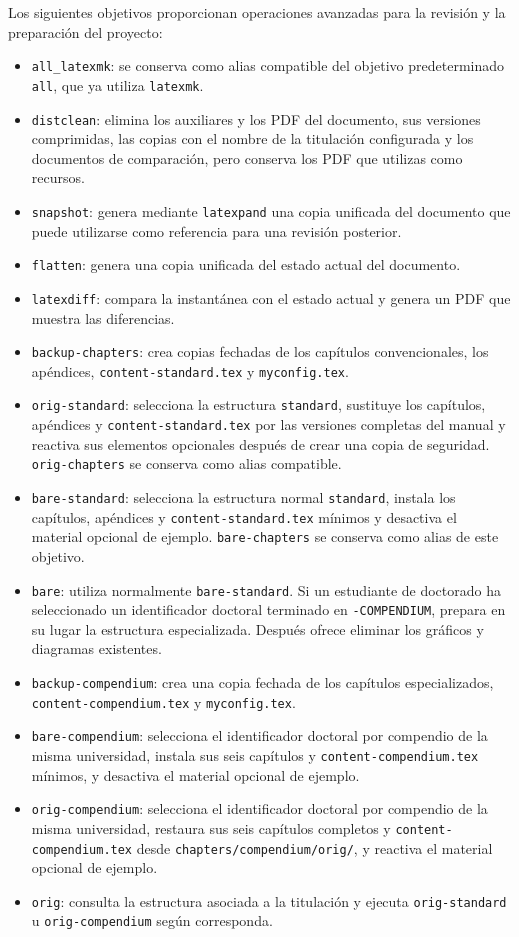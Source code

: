 Los siguientes objetivos proporcionan operaciones avanzadas para la revisión y la preparación del proyecto:

\begin{itemize}
  \item \texttt{all\_latexmk}: se conserva como alias compatible del objetivo predeterminado \texttt{all}, que ya utiliza \texttt{latexmk}.
  \item \texttt{distclean}: elimina los auxiliares y los PDF del documento, sus versiones comprimidas, las copias con el nombre de la titulación configurada y los documentos de comparación, pero conserva los PDF que utilizas como recursos.
  \item \texttt{snapshot}: genera mediante \texttt{latexpand} una copia unificada del documento que puede utilizarse como referencia para una revisión posterior.
  \item \texttt{flatten}: genera una copia unificada del estado actual del documento.
  \item \texttt{latexdiff}: compara la instantánea con el estado actual y genera un PDF que muestra las diferencias.
  \item \texttt{backup-chapters}: crea copias fechadas de los capítulos convencionales, los apéndices, \texttt{content-standard.tex} y \texttt{myconfig.tex}.
  \item \texttt{orig-standard}: selecciona la estructura \texttt{standard}, sustituye los capítulos, apéndices y \texttt{content-standard.tex} por las versiones completas del manual y reactiva sus elementos opcionales después de crear una copia de seguridad. \texttt{orig-chapters} se conserva como alias compatible.
  \item \texttt{bare-standard}: selecciona la estructura normal \texttt{standard}, instala los capítulos, apéndices y \texttt{content-standard.tex} mínimos y desactiva el material opcional de ejemplo. \texttt{bare-chapters} se conserva como alias de este objetivo.
  \item \texttt{bare}: utiliza normalmente \texttt{bare-standard}. Si un estudiante de doctorado ha seleccionado un identificador doctoral terminado en \texttt{-COMPENDIUM}, prepara en su lugar la estructura especializada. Después ofrece eliminar los gráficos y diagramas existentes.
  \item \texttt{backup-compendium}: crea una copia fechada de los capítulos especializados, \texttt{content-compendium.tex} y \texttt{myconfig.tex}.
  \item \texttt{bare-compendium}: selecciona el identificador doctoral por compendio de la misma universidad, instala sus seis capítulos y \texttt{content-compendium.tex} mínimos, y desactiva el material opcional de ejemplo.
  \item \texttt{orig-compendium}: selecciona el identificador doctoral por compendio de la misma universidad, restaura sus seis capítulos completos y \texttt{content-compendium.tex} desde \texttt{chapters/compendium/orig/}, y reactiva el material opcional de ejemplo.
  \item \texttt{orig}: consulta la estructura asociada a la titulación y ejecuta \texttt{orig-standard} u \texttt{orig-compendium} según corresponda.
\end{itemize}

